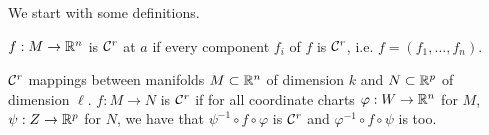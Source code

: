 \noindent We start with some definitions.
\begin{definition}
    $f : M \to \mathbb R^n$ is $\mathcal C^r$ at $a$ if every component $f_i$ of $f$ is $\mathcal C^r$, i.e. $f = (f_1, \dots, f_n)$.
\end{definition}
\begin{definition}
    $\mathcal C^r$ mappings between manifolds $M \subset \mathbb R^n$ of dimension $k$ and $N \subset \mathbb R^p$ of dimension $\ell$. $f : M \to N$ is $\mathcal C^r$ if for all coordinate charts $\varphi : W \to \mathbb R^n$ for $M$, $\psi : Z \to \mathbb R^p$ for $N$, we have that $\psi^{-1} \circ f \circ \varphi$ is $\mathcal C^r$ and $\varphi^{-1} \circ f \circ \psi$ is too.
\end{definition}